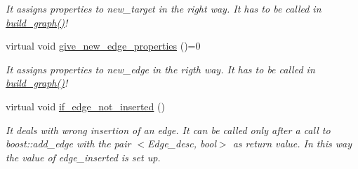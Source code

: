 \begin{DoxyCompactItemize}
\begin{DoxyCompactList}\small\item\em It assigns properties to new\_\-target in the right way. It has to be called in \hyperlink{classreader__base__class_a536131b6cc6f007b87735626c29650c6}{build\_\-graph()}! \item\end{DoxyCompactList}\item 
\hypertarget{classreader__base__class_add3be7869df5b87ba40080897a5d9f1a}{
virtual void \hyperlink{classreader__base__class_add3be7869df5b87ba40080897a5d9f1a}{give\_\-new\_\-edge\_\-properties} ()=0}
\label{classreader__base__class_add3be7869df5b87ba40080897a5d9f1a}

\begin{DoxyCompactList}\small\item\em It assigns properties to new\_\-edge in the rigth way. It has to be called in \hyperlink{classreader__base__class_a536131b6cc6f007b87735626c29650c6}{build\_\-graph()}! \item\end{DoxyCompactList}\item 
\hypertarget{classreader__base__class_a7cdc6fe09127ebba4a91dcbec6e774c2}{
virtual void \hyperlink{classreader__base__class_a7cdc6fe09127ebba4a91dcbec6e774c2}{if\_\-edge\_\-not\_\-inserted} ()}
\label{classreader__base__class_a7cdc6fe09127ebba4a91dcbec6e774c2}

\begin{DoxyCompactList}\small\item\em It deals with wrong insertion of an edge.  It can be called only after a call to boost::add\_\-edge with the pair $<$Edge\_\-desc, bool$>$ as return value. In this way the value of edge\_\-inserted is set up. \item\end{DoxyCompactList}\end{DoxyCompactItemize}
